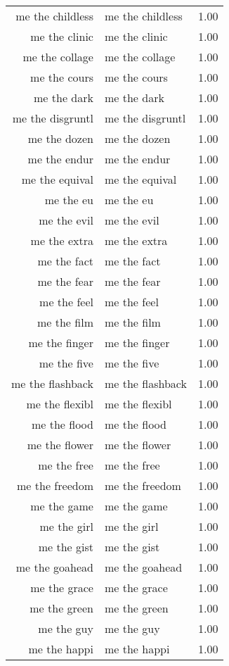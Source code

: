 \begin{table}[ht]
\begin{tabular}{rlr}
  me the childless & me the childless & 1.00 \\ 
  me the clinic & me the clinic & 1.00 \\ 
  me the collage & me the collage & 1.00 \\ 
  me the cours & me the cours & 1.00 \\ 
  me the dark & me the dark & 1.00 \\ 
  me the disgruntl & me the disgruntl & 1.00 \\ 
  me the dozen & me the dozen & 1.00 \\ 
  me the endur & me the endur & 1.00 \\ 
  me the equival & me the equival & 1.00 \\ 
  me the eu & me the eu & 1.00 \\ 
  me the evil & me the evil & 1.00 \\ 
  me the extra & me the extra & 1.00 \\ 
  me the fact & me the fact & 1.00 \\ 
  me the fear & me the fear & 1.00 \\ 
  me the feel & me the feel & 1.00 \\ 
  me the film & me the film & 1.00 \\ 
  me the finger & me the finger & 1.00 \\ 
  me the five & me the five & 1.00 \\ 
  me the flashback & me the flashback & 1.00 \\ 
  me the flexibl & me the flexibl & 1.00 \\ 
  me the flood & me the flood & 1.00 \\ 
  me the flower & me the flower & 1.00 \\ 
  me the free & me the free & 1.00 \\ 
  me the freedom & me the freedom & 1.00 \\ 
  me the game & me the game & 1.00 \\ 
  me the girl & me the girl & 1.00 \\ 
  me the gist & me the gist & 1.00 \\ 
  me the goahead & me the goahead & 1.00 \\ 
  me the grace & me the grace & 1.00 \\ 
  me the green & me the green & 1.00 \\ 
  me the guy & me the guy & 1.00 \\ 
  me the happi & me the happi & 1.00 \\ 

\end{tabular}
\end{table}
